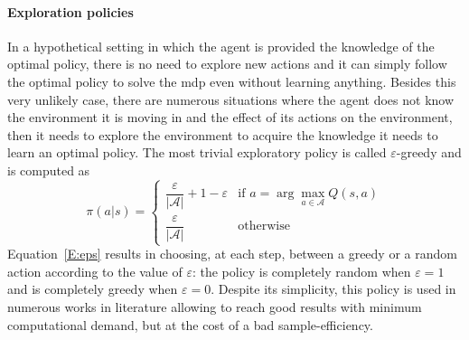\paragraph{Exploration policies}
In a hypothetical setting in which the agent is provided the knowledge of the optimal policy, there is no need to explore new actions and it can simply follow the optimal policy to solve the \gls{mdp} even without learning anything. Besides this very unlikely case, there are numerous situations where the agent does not know the environment it is moving in and the effect of its actions on the environment, then it needs to explore the environment to acquire the knowledge it needs to learn an optimal policy. The most trivial exploratory policy is called $\varepsilon$-greedy and is computed as
\begin{equation}\label{E:eps}
\pi(a|s)=
    \begin{cases}
    \dfrac{\varepsilon}{|\mathcal{A}|} + 1 - \varepsilon & \text{if } a = \arg\max_{a \in \mathcal{A}}Q(s,a)\\
    \dfrac{\varepsilon}{|\mathcal{A}|} & \text{otherwise}
    \end{cases}
\end{equation}
Equation~\ref{E:eps} results in choosing, at each step, between a greedy or a random action according to the value of $\varepsilon$: the policy is completely random when $\varepsilon = 1$ and is completely greedy when $\varepsilon = 0$.
Despite its simplicity, this policy is used in numerous works in literature allowing to reach good results with minimum computational demand, but at the cost of a bad sample-efficiency.

